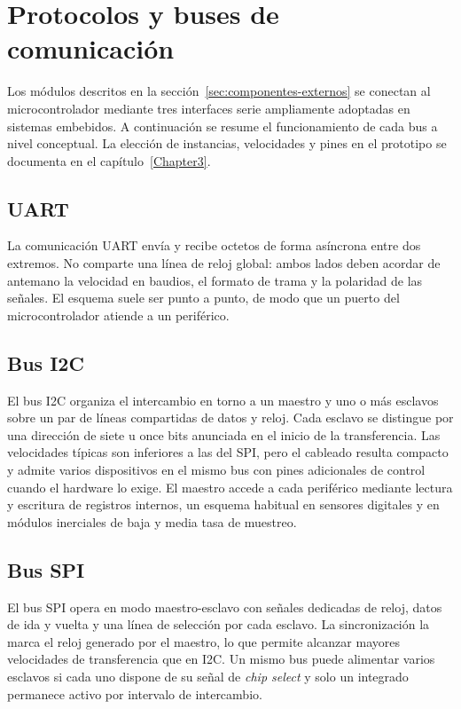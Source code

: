 \section{Protocolos y buses de comunicación}
\label{sec:protocolos-buses}

Los módulos descritos en la sección~\ref{sec:componentes-externos} se conectan al microcontrolador mediante tres interfaces serie ampliamente adoptadas en sistemas embebidos. A continuación se resume el funcionamiento de cada bus a nivel conceptual. La elección de instancias, velocidades y pines en el prototipo se documenta en el capítulo~\ref{Chapter3}.

\subsection{UART}

La comunicación UART envía y recibe octetos de forma asíncrona entre dos extremos. No comparte una línea de reloj global: ambos lados deben acordar de antemano la velocidad en baudios, el formato de trama y la polaridad de las señales. El esquema suele ser punto a punto, de modo que un puerto del microcontrolador atiende a un periférico.

\subsection{Bus I2C}

El bus I2C organiza el intercambio en torno a un maestro y uno o más esclavos sobre un par de líneas compartidas de datos y reloj. Cada esclavo se distingue por una dirección de siete u once bits anunciada en el inicio de la transferencia. Las velocidades típicas son inferiores a las del SPI, pero el cableado resulta compacto y admite varios dispositivos en el mismo bus con pines adicionales de control cuando el hardware lo exige. El maestro accede a cada periférico mediante lectura y escritura de registros internos, un esquema habitual en sensores digitales y en módulos inerciales de baja y media tasa de muestreo.

\subsection{Bus SPI}

El bus SPI opera en modo maestro-esclavo con señales dedicadas de reloj, datos de ida y vuelta y una línea de selección por cada esclavo. La sincronización la marca el reloj generado por el maestro, lo que permite alcanzar mayores velocidades de transferencia que en I2C. Un mismo bus puede alimentar varios esclavos si cada uno dispone de su señal de \textit{chip select} y solo un integrado permanece activo por intervalo de intercambio.